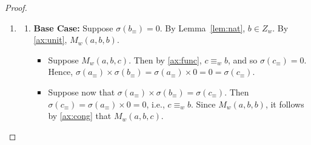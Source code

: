 \documentclass[10pt,a4paper]{amsart}
\begin{document}
\begin{proof}
\begin{enumerate}
\begin{enumerate}[label=(\roman*)]
\begin{itemize}
                \item[($\Rightarrow)$] Suppose now that $\sigma(a_\equiv) + \sigma(b'_\equiv) \neq \sigma(c'_\equiv)$ for some $a_\equiv$ and $c'_\equiv$. 
                Since $\sigma$ is an isomorphism, there's a $d' \in N_w$ such that $\sigma(a_\equiv) + \sigma(b'_\equiv) = \sigma(d'_\equiv)$. 
                Thus, by the above reasoning, $A_w(a,b',d')$. 
                Since $\sigma(c'_\equiv) \neq \sigma(d'_\equiv)$, $c' \not\equiv_w d'$. 
                So by \ref{ax:func}, $\neg A_w(a,b',c')$. 
            \end{itemize}
        \end{enumerate}
     
        \item 
        \begin{enumerate}[label=(\roman*)]
            \item \textbf{Base Case:} Suppose $\sigma(b_\equiv) = 0$. 
            By Lemma~\ref{lem:nat}, $b \in Z_w$. 
            By \ref{ax:unit}, $M_w(a,b,b)$. 
            \begin{itemize}
                \item[($\Rightarrow$)] Suppose $M_w(a,b,c)$. 
                Then by \ref{ax:func}, $c \equiv_w b$, and so $\sigma(c_\equiv) = 0$. 
                Hence, $\sigma(a_\equiv) \times \sigma(b_\equiv) = \sigma(a_\equiv) \times 0 = 0 = \sigma(c_\equiv)$. 

                \item[($\Leftarrow$)] Suppose now that $\sigma(a_\equiv) \times \sigma(b_\equiv) = \sigma(c_\equiv)$. 
                Then $\sigma(c_\equiv) = \sigma(a_\equiv) \times 0 = 0$, i.e., $c \equiv_w b$. 
                Since $M_w(a,b,b)$, it follows by \ref{ax:cong} that $M_w(a,b,c)$. 
            \end{itemize}


\end{enumerate}
\end{enumerate}
\end{proof}
\end{document}
